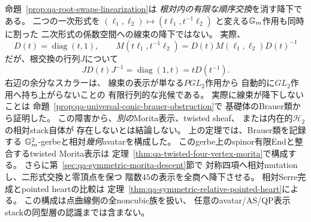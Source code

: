 \begin{remark}[相対有限Endと無標識avatarの正確な境界]
\label{rem:qa-brauer-scope}
命題~\ref{prop:qa-root-swaps-linearization}は
\emph{根対内の有限な順序交換}を消す降下である。
二つの一次形式を
$(\ell_1,\ell_2)\mapsto(t\ell_1,t^{-1}\ell_2)$
と変える$\mathbb G_m$作用も同時に割った
二次形式の係数空間への線束の降下ではない。
実際、
\[
 D(t)=\operatorname{diag}(t,1),\qquad
 M(t\ell_1,t^{-1}\ell_2)=D(t)M(\ell_1,\ell_2)D(t)^{-1}
\]
だが、根交換の行列$J$について
\[
 J D(t)J^{-1}
   =\operatorname{diag}(1,t)
   =tD(t^{-1}) .
\]
右辺の余分なスカラーは、
線束の表示が単なる$PGL_2$作用から
自動的に$GL_2$作用へ持ち上がらないことの
有限行列的な兆候である。
実際に線束が降下しないことは
命題~\ref{prop:qa-universal-conic-brauer-obstruction}で
基礎体のBrauer類から証明した。
この障害から、\emph{別の}Morita表示、twisted sheaf、
または内在的$\mathcal H_2$の相対stack自体が
存在しないとは結論しない。
上の定理では、Brauer類を記録する
$\mathbb G_m^2$-gerbeと相対\emph{幾何}avatarを構成した。
このgerbe上のspinor有限Endと整合するtwisted Morita表示は
定理~\ref{thm:qa-twisted-four-vertex-morita}で構成する。
さらに第~\ref{sec:qa-symmetric-morita-descent}節で
対称四項へ相対mutationし、二形式交換と零頂点を保つ
階数$45$の表示を全商へ降下させる。
相対Serre完成とpointed heartの比較は
定理~\ref{thm:qa-symmetric-relative-pointed-heart}による。
この構成は点曲線側の全noncubic族を扱い、
任意のavatar/AS/QP表示stackの同型層の認識までは含まない。
\end{remark}
